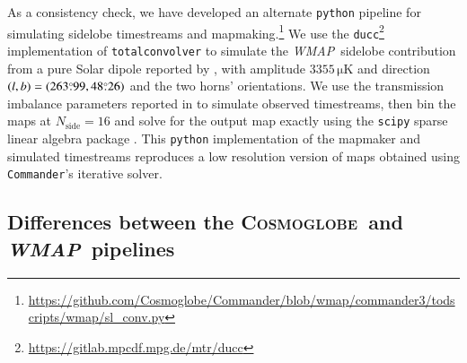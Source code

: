 \documentclass[twocolumn]{aa}
\def\WMAP{\emph{WMAP}}
\def\commander{\texttt{Commander}}
\newcommand{\cosmoglobe}{\textsc{Cosmoglobe}}
\begin{document}
As a consistency check, we have developed an alternate \texttt{python} pipeline
for simulating sidelobe timestreams and
mapmaking.\footnote{\url{https://github.com/Cosmoglobe/Commander/blob/wmap/commander3/todscripts/wmap/sl_conv.py}}
We use the \texttt{ducc}\footnote{\url{https://gitlab.mpcdf.mpg.de/mtr/ducc}}
implementation of \texttt{totalconvolver} \citep{wandelt2001,prezeau2010} to
simulate the \WMAP\ sidelobe contribution from a pure Solar dipole reported by
\citet{jarosik2010}, with amplitude $3355\,\mathrm{\mu K}$ and direction
${(l,b)=(263\overset{\circ}{.}99,48\overset{\circ}{.}26)}$ and the two horns' orientations.  We use the
transmission imbalance parameters reported in \citet{bennett2012} to simulate
observed timestreams, then bin the maps at $N_\mathrm{side}=16$ and solve for
the output map exactly using the \texttt{scipy} sparse linear algebra package
\citep{scipy2020}. This \texttt{python} implementation of the mapmaker and
simulated timestreams reproduces a low resolution version of maps obtained
using \commander's iterative solver.

\subsection{Differences between the \cosmoglobe\ and \WMAP\ pipelines}
\label{sec:differences}

\end{document}
